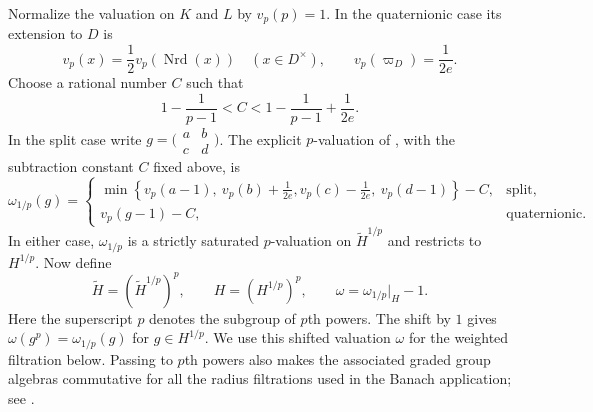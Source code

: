 \documentclass[11pt]{article}
\numberwithin{equation}{section}
\theoremstyle{definition}
\theoremstyle{remark}
\DeclareMathOperator{\Nrd}{Nrd}
\begin{document}
Normalize the valuation on $K$ and $L$ by $v_p(p)=1$.
In the quaternionic case its extension to $D$ is
\[
 v_p(x)=\frac12v_p(\Nrd(x))\quad(x\in D^\times),
 \qquad v_p(\varpi_D)=\frac1{2e}.
\]
Choose a rational number $C$ such that
\begin{equation}\label{eq:valuation-constant-range}
 1-\frac1{p-1}<C<1-\frac1{p-1}+\frac1{2e}.
\end{equation}
In the split case write $g=\bigl(\begin{smallmatrix}a&b\\c&d\end{smallmatrix}\bigr)$.
The explicit $p$-valuation of \cite[(13)--(14)]{Sor26b}, with
the subtraction constant $C$ fixed above, is
\begin{equation}\label{eq:group-valuation}
 \omega_{1/p}(g)=
 \begin{cases}
  \min\left\{v_p(a-1),\ v_p(b)+\frac1{2e},
             v_p(c)-\frac1{2e},\ v_p(d-1)\right\}-C,
       &\text{split},\\[4pt]
  v_p(g-1)-C,&\text{quaternionic}.
 \end{cases}
\end{equation}
In either case, $\omega_{1/p}$ is a strictly saturated
$p$-valuation on $\widetilde H^{1/p}$ and restricts to
$H^{1/p}$. Now define
\begin{equation}\label{eq:groups-and-valuation}
 \widetilde H=(\widetilde H^{1/p})^p,\qquad
 H=(H^{1/p})^p,\qquad
 \omega=\omega_{1/p}|_H-1.
\end{equation}
Here the superscript $p$ denotes the subgroup of $p$th powers.
The shift by $1$ gives $\omega(g^p)=\omega_{1/p}(g)$ for
$g\in H^{1/p}$. We use this shifted valuation $\omega$ for the
weighted filtration below. Passing to $p$th powers also makes the associated
graded group algebras commutative for all the radius filtrations
used in the Banach application; see \cite[Lemma~4.3 and \S~6.2]{Sor26b}.
\end{document}
